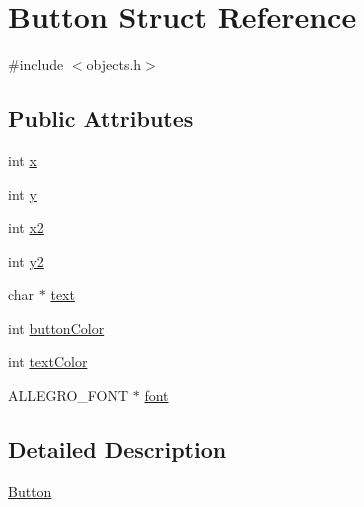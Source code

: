 \hypertarget{struct_button}{\section{Button Struct Reference}
\label{struct_button}
}


{\ttfamily \#include $<$objects.\-h$>$}

\subsection*{Public Attributes}
\begin{DoxyCompactItemize}
\item 
int \hyperlink{struct_button_a2ec3bc40025b64b44319e7464164d61f}{x}
\item 
int \hyperlink{struct_button_afff35ce0c47f662c3b096e5b644648a5}{y}
\item 
int \hyperlink{struct_button_af1cfe70765d31617c45a1cd42b1763c0}{x2}
\item 
int \hyperlink{struct_button_aaa0cda56851a1ad65816d1f6849d6c6f}{y2}
\item 
char $\ast$ \hyperlink{struct_button_adafb1aaa363ab04fca61c94c0937bd3d}{text}
\item 
int \hyperlink{struct_button_ac05b2e6dac95881cdf4dbdcf934c2509}{button\-Color}
\item 
int \hyperlink{struct_button_a6d140cd7f6e64c60c1b207d85b9392e6}{text\-Color}
\item 
A\-L\-L\-E\-G\-R\-O\-\_\-\-F\-O\-N\-T $\ast$ \hyperlink{struct_button_a3417f40b044358b8a2a0009f481e15c5}{font}
\end{DoxyCompactItemize}


\subsection{Detailed Description}
\hyperlink{struct_button}{Button} 

